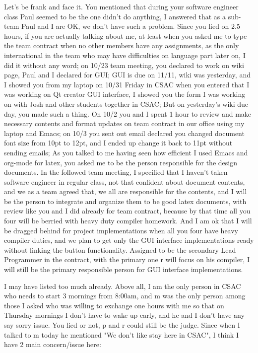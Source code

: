 \documentclass[12pt]{book}
\begin{document}
Let's be frank and face it. You mentioned that during your software engineer class Paul seemed to be the one didn't do anything, I answered that as a sub-team Paul and I are OK, we don't have such a problem. 
Since you lied on 2.5 hours, if you are actually talking about me, at least when you asked me to type the team contract when no other members have any assignments, as the only international in the team who may have difficulties on language part later on, I did it without any word; 
on 10/23 team meeting, you declared to work on wiki page, Paul and I declared for GUI; GUI is due on 11/11, wiki was yesterday, and I showed you from my laptop on 10/31 Friday in CSAC when you entered that I was working on Qt creator GUI interface, I showed you the form I was working on with Josh and other students together in CSAC; But on yesterday's wiki due day, you made such a thing. 
On 10/2 you and I spent 1 hour to review and make necessary contents and format updates on team contract in our office using my laptop and Emacs; on 10/3 you sent out email declared you changed document font size from 10pt to 12pt, and I ended up change it back to 11pt without sending emails; 
As you talked to me having seen how efficient I used Emacs and org-mode for latex, you asked me to be the person responsible for the design documents. In the followed team meeting, I specified that I haven't taken software engineer in regular class, not that confident about document contents, and we as a team agreed that, we all are responsible for the contents, and I will be the person to integrate and organize them to be good latex documents, with review like you and I did  already for team contract, because by that time all you four will be berried with heavy duty compiler homework. 
And I am ok that I will be dragged behind for project implementations when all you four have heavy compiler duties, and we plan to get only the GUI interface implementations ready without linking the button functionality. Assigned to be the secondary Lead Programmer in the contract, with the primary one r will focus on his compiler, I will still be the primary responsible person for GUI interface implementations. 

I may have listed too much already. Above all, I am the only person in CSAC who needs to start 3 mornings from 8:00am, and m was the only person among those I asked who was willing to exchange one hours with me so that on Thursday mornings I don't have to wake up early, and he and I don't have any say sorry issue. You lied or not, p and r could still be the judge. Since when I talked to m today he mentioned "We don't like stay here in CSAC", I think I have 2 main concern/issue here:
\end{document}
